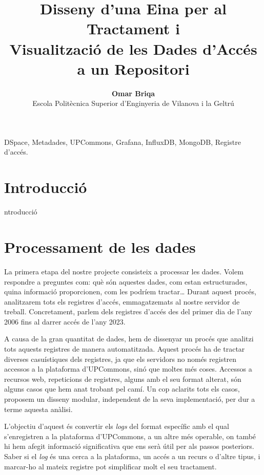 \documentclass[lettersize,journal]{IEEEtran}
\begin{document}
\title{Disseny d'una Eina per al Tractament i \\ Visualització de les Dades d'Accés a un Repositori}
\author{\textbf{Omar Briqa} \\ \vspace{5pt} Escola Politècnica Superior d'Enginyeria de Vilanova i la Geltrú}
\maketitle

\begin{abstract}
\end{abstract}

\begin{IEEEkeywords}
    DSpace, Metadades, UPCommons, Grafana, InfluxDB, MongoDB, Registre d’accés.
\end{IEEEkeywords}


\section{Introducció}\label{sec:introduction}
 ntroducció

\section{Processament de les dades}\label{sec:data-processing}
La primera etapa del nostre projecte consisteix a processar les dades.
Volem respondre a preguntes com: què són aquestes dades, com estan estructurades, quina informació proporcionen, com les podríem tractar\dots
Durant aquest procés, analitzarem tots els registres d'accés, emmagatzemats al nostre servidor de treball.
Concretament, parlem dels registres d'accés des del primer dia de l'any 2006 fins al darrer accés de l'any 2023.

A causa de la gran quantitat de dades, hem de dissenyar un procés que analitzi tots aquests registres de manera automatitzada.
Aquest procés ha de tractar diverses casuístiques dels registres, ja que els servidors no només registren accessos a la plataforma d'UPCommons, sinó que moltes més coses.
Accessos a recursos web, repeticions de registres, alguns amb el seu format alterat, són alguns casos que hem anat trobant pel camí.
Un cop aclarits tots els casos, proposem un disseny modular, independent de la seva implementació, per dur a terme aquesta anàlisi.

L'objectiu d'aquest és convertir els \textit{logs} del format específic amb el qual s'enregistren a la plataforma d'UPCommons, a un altre més operable, on també hi hem afegit informació significativa que ens serà útil per als passos posteriors.
Saber si el \textit{log} és una cerca a la plataforma, un accés a un recurs o d'altre tipus, i marcar-ho al mateix registre pot simplificar molt el seu tractament.
\end{document}
